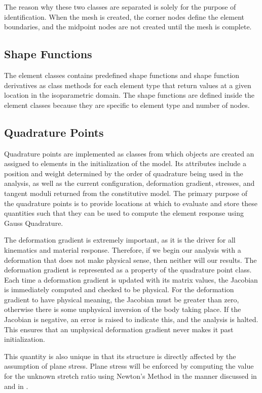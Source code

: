 \documentclass[]{spie}  %
\begin{document}
The reason why these two classes are separated is solely for the purpose of identification. When the mesh is created, the corner nodes define the element boundaries, and the midpoint nodes are not created until the mesh is complete.

\subsection{Shape Functions}
The element classes contains predefined shape functions and shape function derivatives as class methods for each element type that return values at a given location in the isoparametric domain. The shape functions are defined inside the element classes because they are specific to element type and number of nodes.

\subsection{Quadrature Points}
Quadrature points are implemented as classes from which objects are created an assigned to elements in the initialization of the model. Its attributes include a position and weight determined by the order of quadrature being used in the analysis, as well as the current configuration, deformation gradient, stresses, and tangent moduli returned from the constitutive model. The primary purpose of the quadrature points is to provide locations at which to evaluate and store these quantities such that they can be used to compute the element response using Gauss Quadrature.

The deformation gradient is extremely important, as it is the driver for all kinematics and material response. Therefore, if we begin our analysis with a deformation that does not make physical sense, then neither will our results. The deformation gradient is represented as a property of the quadrature point class. Each time a deformation gradient is updated with its matrix values, the Jacobian is immediately computed and checked to be physical. For the deformation gradient to have physical meaning, the Jacobian must be greater than zero, otherwise there is some unphysical inversion of the body taking place. If the Jacobian is negative, an error is raised to indicate this, and the analysis is halted. This ensures that an unphysical deformation gradient never makes it past initialization. 

This quantity is also unique in that its structure is directly affected by the assumption of plane stress. Plane stress will be enforced by computing the value for the unknown stretch ratio using Newton's Method in the manner discussed in \textit{} and in \textit{}.
\end{document}
